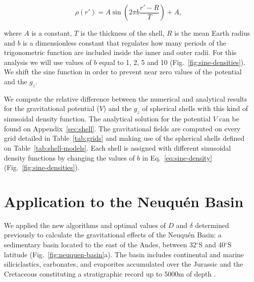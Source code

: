 \documentclass[extra, referee]{gji}
\begin{document}
\begin{equation}
    \rho(r') = A \sin \left( 2 \pi b \frac{r' - R}{T} \right) + A,
    \label{eq:sine-density}
\end{equation}

\noindent where $A$ is a constant, $T$ is the thickness of the shell, $R$ is the mean
Earth radius and $b$ is a dimensionless constant that regulates how many periods of the
trigonometric function are included inside the inner and outer radii.
For this analysis we will use values of $b$ equal to 1, 2, 5 and 10
(Fig.~\ref{fig:sine-densities}).
We shift the sine function in order to prevent near zero values of the potential and the
$g_z$.

We compute the relative difference between the numerical and analytical results for the
gravitational potential ($V$) and the $g_z$ of spherical shells with this kind of
sinusoidal density function.
The analytical solution for the potential $V$ can be found on Appendix~\ref{sec:shell}.
The gravitational fields are computed on every grid detailed in Table~\ref{tab:grids}
and making use of the spherical shells defined on Table~\ref{tab:shell-models}.
Each shell is assigned with different sinusoidal density functions by changing the
values of $b$ in Eq.~\ref{eq:sine-density} (Fig.~\ref{fig:sine-densities}).



\section{Application to the Neuqu\'en Basin}

We applied the new algorithms and optimal values of $D$ and $\delta$ determined
previously to calculate the gravitational effects of the Neuqu\'en Basin:
a sedimentary basin
located to the east of the Andes, between 32$^\circ$S and 40$^\circ$S latitude
(Fig.~\ref{fig:neuquen-basin}a).
The basin includes continental and marine siliciclastics, carbonates, and evaporites
accumulated over the Jurassic and the Cretaceous constituting a stratigraphic record up
to 5000m of depth \citep{Howell2005}.
\end{document}
